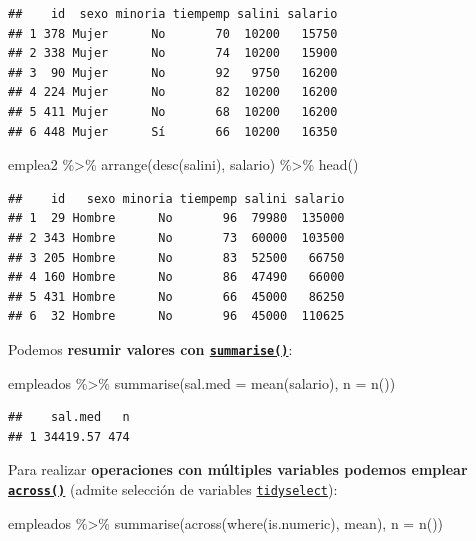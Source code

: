 \documentclass[
]{book}
\newenvironment{Shaded}{\begin{snugshade}}{\end{snugshade}}
\newcommand{\AttributeTok}[1]{\textcolor[rgb]{0.77,0.63,0.00}{#1}}
\newcommand{\FunctionTok}[1]{\textcolor[rgb]{0.00,0.00,0.00}{#1}}
\newcommand{\NormalTok}[1]{#1}
\newcommand{\SpecialCharTok}[1]{\textcolor[rgb]{0.00,0.00,0.00}{#1}}
\theoremstyle{break}
\theoremstyle{nonumberplain}
\begin{document}
\begin{verbatim}
##    id  sexo minoria tiempemp salini salario
## 1 378 Mujer      No       70  10200   15750
## 2 338 Mujer      No       74  10200   15900
## 3  90 Mujer      No       92   9750   16200
## 4 224 Mujer      No       82  10200   16200
## 5 411 Mujer      No       68  10200   16200
## 6 448 Mujer      Sí       66  10200   16350
\end{verbatim}

\begin{Shaded}
\begin{Highlighting}[]
\NormalTok{emplea2 }\SpecialCharTok{\%\textgreater{}\%} \FunctionTok{arrange}\NormalTok{(}\FunctionTok{desc}\NormalTok{(salini), salario) }\SpecialCharTok{\%\textgreater{}\%} \FunctionTok{head}\NormalTok{()}
\end{Highlighting}
\end{Shaded}

\begin{verbatim}
##    id   sexo minoria tiempemp salini salario
## 1  29 Hombre      No       96  79980  135000
## 2 343 Hombre      No       73  60000  103500
## 3 205 Hombre      No       83  52500   66750
## 4 160 Hombre      No       86  47490   66000
## 5 431 Hombre      No       66  45000   86250
## 6  32 Hombre      No       96  45000  110625
\end{verbatim}

Podemos \textbf{resumir valores con \href{https://dplyr.tidyverse.org/reference/summarise.html}{\texttt{summarise()}}}:

\begin{Shaded}
\begin{Highlighting}[]
\NormalTok{empleados }\SpecialCharTok{\%\textgreater{}\%} \FunctionTok{summarise}\NormalTok{(}\AttributeTok{sal.med =} \FunctionTok{mean}\NormalTok{(salario), }\AttributeTok{n =} \FunctionTok{n}\NormalTok{())}
\end{Highlighting}
\end{Shaded}

\begin{verbatim}
##    sal.med   n
## 1 34419.57 474
\end{verbatim}

Para realizar \textbf{operaciones con múltiples variables podemos emplear \href{https://dplyr.tidyverse.org/reference/across.html}{\texttt{across()}}} (admite selección de variables \href{https://tidyselect.r-lib.org}{\texttt{tidyselect}}):

\begin{Shaded}
\begin{Highlighting}[]
\NormalTok{empleados }\SpecialCharTok{\%\textgreater{}\%} \FunctionTok{summarise}\NormalTok{(}\FunctionTok{across}\NormalTok{(}\FunctionTok{where}\NormalTok{(is.numeric), mean), }\AttributeTok{n =} \FunctionTok{n}\NormalTok{())}
\end{Highlighting}
\end{Shaded}
\end{document}
